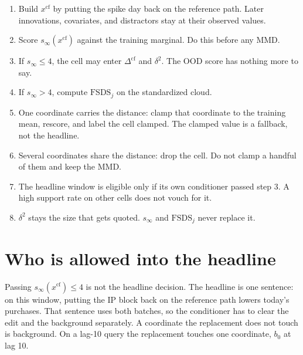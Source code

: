 \documentclass[11pt]{article}
\begin{document}
\begin{enumerate}
\item Build $x^{\mathrm{cf}}$ by putting the spike day back on the reference path.
Later innovations, covariates, and distractors stay at their observed values.
\item Score $s_{\infty}(x^{\mathrm{cf}})$ against the training marginal.
Do this before any MMD.
\item If $s_{\infty}\le 4$, the cell may enter $\Delta^{\mathrm{cf}}$ and $\delta^{2}$.
The OOD score has nothing more to say.
\item If $s_{\infty}>4$, compute $\mathrm{FSDS}_{j}$ on the standardized cloud.
\item One coordinate carries the distance: clamp that coordinate to the training mean, rescore, and label the cell clamped.
The clamped value is a fallback, not the headline.
\item Several coordinates share the distance: drop the cell.
Do not clamp a handful of them and keep the MMD.
\item The headline window is eligible only if its own conditioner passed step 3.
A high support rate on other cells does not vouch for it.
\item $\delta^{2}$ stays the size that gets quoted.
$s_{\infty}$ and $\mathrm{FSDS}_{j}$ never replace it.
\end{enumerate}

\section{Who is allowed into the headline}

Passing $s_{\infty}(x^{\mathrm{cf}})\le 4$ is not the headline decision.
The headline is one sentence: on this window, putting the IP block back on the reference path lowers today's purchases.
That sentence uses both batches, so the conditioner has to clear the edit and the background separately.
A coordinate the replacement does not touch is background.
On a lag-10 query the replacement touches one coordinate, $b_{0}$ at lag 10.
\end{document}
